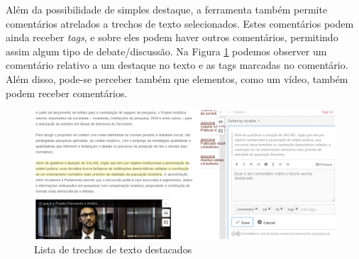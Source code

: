 \begin{landscape}
Além da possibilidade de simples destaque, a ferramenta também permite comentários atrelados a trechos de texto selecionados. Estes comentários podem ainda receber \textit{tags}, e sobre eles podem haver outros comentários, permitindo assim algum tipo de debate/discussão. Na Figura \ref{fig:hypotesis-comentario} podemos observer um comentário relativo a um destaque no texto e as tags marcadas no comentário. Além disso, pode-se perceber também que elementos, como um vídeo, também podem receber comentários.

    \begin{figure}[htb]%
        \begin{center}
            \includegraphics[scale=0.55]{./imagens/hypotesis-comentario.png}%
        \end{center}%
        \caption{Lista de trechos de texto destacados\label{fig:hypotesis-comentario}}%
    \end{figure}%
\end{landscape}

